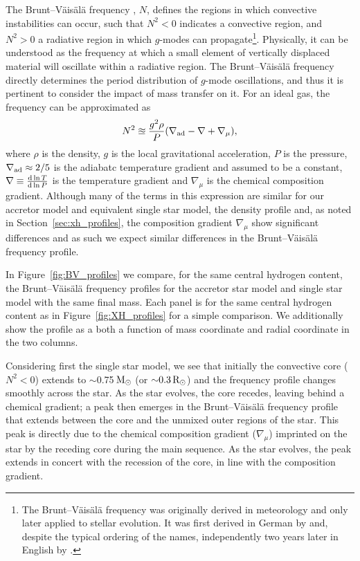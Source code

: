 \documentclass[desactivate]{aa}
\begin{document}
The Brunt–Väisälä frequency \citep{BVF-vaisala, BVF-brunt}, $N$, defines the regions in which convective instabilities can occur, such that $N^2 < 0$ indicates a convective region, and $N^2 > 0$ a radiative region in which $g$-modes can propagate\footnote{The Brunt–Väisälä frequency was originally derived in meteorology and only later applied to stellar evolution. It was first derived in German by \citet{BVF-vaisala} and, despite the typical ordering of the names, independently two years later in English by \citet{BVF-brunt}.}.
Physically, it can be understood as the frequency at which a small element of vertically displaced material will oscillate within a radiative region.
The Brunt–Väisälä frequency directly determines the period distribution of $g$-mode oscillations, and thus it is pertinent to consider the impact of mass transfer on it. For an ideal gas, the frequency can be approximated as
\begin{equation}\label{eq:bvf}
    N^2 \approxeq \frac{g^2 \rho}{P} \qty(\nabla_{\rm ad} - \nabla + \nabla_\mu),
\end{equation}
where $\rho$ is the density, $g$ is the local gravitational acceleration, $P$ is the pressure, $\nabla_{\rm ad} \approx 2/5$ is the adiabatc temperature gradient and assumed to be a constant, $\nabla \equiv \dv{\ln T}{\ln P}$ is the temperature gradient and $\nabla_\mu$ is the chemical composition gradient. Although many of the terms in this expression are similar for our accretor model and equivalent single star model, the density profile and, as noted in Section~\ref{sec:xh_profiles}, the composition gradient $\nabla_\mu$ show significant differences and as such we expect similar differences in the Brunt–Väisälä frequency profile.

In Figure~\ref{fig:BV_profiles} we compare, for the same central hydrogen content, the Brunt–Väisälä frequency profiles for the accretor star model and single star model with the same final mass. Each panel is for the same central hydrogen content as in Figure~\ref{fig:XH_profiles} for a simple comparison. We additionally show the profile as a both a function of mass coordinate and radial coordinate in the two columns.

Considering first the single star model, we see that initially the convective core ($N^2<0$) extends to ${\sim}$0.75$\,{\rm M_\odot}$ (or ${\sim}0.3\,{\rm R_\odot}$) and the frequency profile changes smoothly across the star. As the star evolves, the core recedes, leaving behind a chemical gradient; a peak then emerges in the Brunt–Väisälä frequency profile that extends between the core and the unmixed outer regions of the star. This peak is directly due to the chemical composition gradient ($\nabla_\mu$) imprinted on the star by the receding core during the main sequence. As the star evolves, the peak extends in concert with the recession of the core, in line with the composition gradient.
\end{document}
